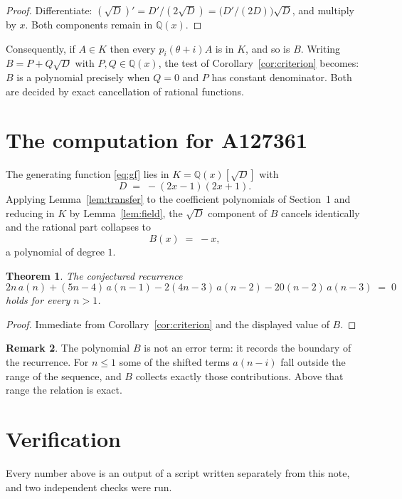 \documentclass[11pt,a4paper]{article}
\theoremstyle{plain}
\newtheorem{theorem}{Theorem}
\theoremstyle{definition}
\newtheorem{remark}[theorem]{Remark}
\begin{document}
\begin{proof}
Differentiate: $(\sqrt{D})'=D'/(2\sqrt{D})=\bigl(D'/(2D)\bigr)\sqrt{D}$, and multiply by
$x$. Both components remain in $\mathbb{Q}(x)$.
\end{proof}

Consequently, if $A\in K$ then every $p_{i}(\theta+i)A$ is in $K$, and so is $B$. Writing
$B=P+Q\sqrt{D}$ with $P,Q\in\mathbb{Q}(x)$, the test of Corollary~\ref{cor:criterion}
becomes: $B$ is a polynomial precisely when $Q=0$ and $P$ has constant denominator. Both
are decided by exact cancellation of rational functions.

\section{The computation for A127361}

The generating function \eqref{eq:gf} lies in $K=\mathbb{Q}(x)[\sqrt{D}]$ with
\[
D \;=\; - \left(2 x - 1\right) \left(2 x + 1\right) .
\]
Applying Lemma~\ref{lem:transfer} to the coefficient polynomials of Section~1 and reducing
in $K$ by Lemma~\ref{lem:field}, the $\sqrt{D}$ component of $B$ cancels identically and
the rational part collapses to
\[
B(x)\;=\;- x ,
\]
a polynomial of degree $1$.

\begin{theorem}
The conjectured recurrence
\[
2 n\,a(n) + (5 n - 4)\,a(n-1) -  2 \left(4 n - 3\right)\,a(n-2) -  20 \left(n - 2\right)\,a(n-3) \;=\;0
\]
holds for every $n>1$.
\end{theorem}

\begin{proof}
Immediate from Corollary~\ref{cor:criterion} and the displayed value of $B$.
\end{proof}

\begin{remark}
The polynomial $B$ is not an error term: it records the boundary of the recurrence. For
$n\le1$ some of the shifted terms $a(n-i)$ fall outside the range of the sequence,
and $B$ collects exactly those contributions. Above that range the relation is exact.
\end{remark}

\section{Verification}

Every number above is an output of a script written separately from this note, and two
independent checks were run.
\end{document}

